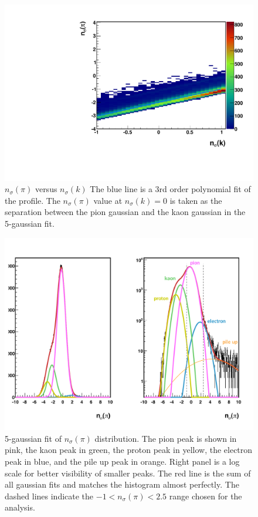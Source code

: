 \documentclass[letterpaper, abstract = on,listof=totoc, bibliography=totoc]{scrreprt}
\begin{document}
 \begin{figure}
\begin{center}
\includegraphics[width = .7\textwidth]{exampleNsigNsig.pdf}
\caption[$n_\sigma(\pi)$ versus $n_\sigma(k)$]{$n_\sigma(\pi)$ versus $n_\sigma(k)$ The blue line is a 3rd order polynomial fit of the profile. The $n_\sigma(\pi)$ value at $n_\sigma(k) = 0$ is taken as the separation between the pion gaussian and the kaon gaussian in the 5-gaussian fit.}
\label{fig:nSignSig}
\end{center}
\end{figure}



 \begin{figure}
\begin{center}
\includegraphics[width = 1\textwidth]{histogramExample2Fit_editFlat2.pdf}
\caption[5-gaussian fit of $n_\sigma(\pi)$ distribution]{5-gaussian fit of $n_\sigma(\pi)$ distribution. The pion peak is shown in pink, the kaon peak in green, the proton peak in yellow, the electron peak in blue, and the pile up peak in orange. Right panel is a log scale for better visibility of smaller peaks. The red line is the sum of all gaussian fits and matches the histogram almost perfectly. The dashed lines indicate the $-1 < n_\sigma(\pi) < 2.5$ range chosen for the analysis.}
\label{fig:nSigExampleFit}
\end{center}
\end{figure}
\end{document}

